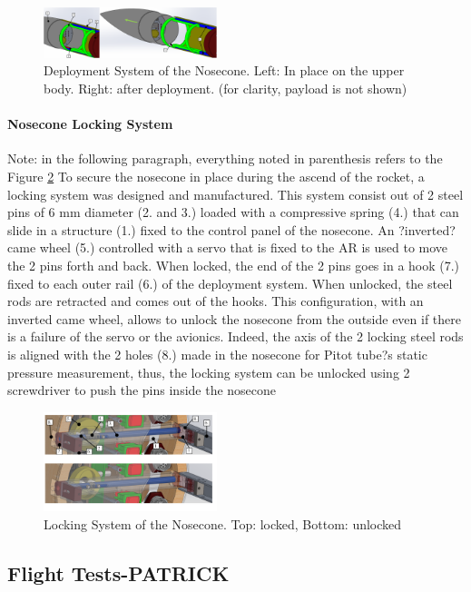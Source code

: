   \begin{figure}[h!]
 	\centering
        \includegraphics[width=0.45\textwidth]{img/AV_FIG_CAD_depl_sys_1.PNG}
        \caption{Deployment System of the Nosecone. Left: In place on the upper body. Right: after deployment. (for clarity, payload is not shown)}
        \label{f:av_deployment_sys}
 \end{figure}

\paragraph{Nosecone Locking System}
Note: in the following paragraph, everything noted in parenthesis refers to the Figure \ref{f:av_locking_sys}
To secure the nosecone in place during the ascend of the rocket, a locking system was designed and manufactured. This system consist out of 2 steel pins of 6 mm diameter (2. and 3.) loaded with a compressive spring (4.) that can slide in a structure (1.) fixed to the control panel of the nosecone. An ?inverted? came wheel (5.) controlled with a servo that is fixed to the AR is used to move the 2 pins forth and back. When locked, the end of the 2 pins goes in a hook (7.) fixed to each outer rail (6.) of the
deployment system. When unlocked, the steel rods are retracted and comes out of the hooks. 
This configuration, with an inverted came wheel, allows to unlock the nosecone from the outside even if there is a failure of the servo or the avionics. Indeed, the axis of the 2 locking steel rods is aligned with the 2 holes (8.) made in the nosecone for Pitot tube?s static pressure measurement, thus, the locking system can be unlocked using 2 screwdriver to push the pins inside the nosecone

  \begin{figure}[h!]
 	\centering
        \includegraphics[width=0.45\textwidth]{img/AV_FIG_CAD_lockingsystem_22.PNG}
        \caption{Locking System of the Nosecone. Top: locked, Bottom: unlocked}
        \label{f:av_locking_sys}
 \end{figure}

\subsection{Flight Tests-PATRICK}
\label{subsection:flightTests}